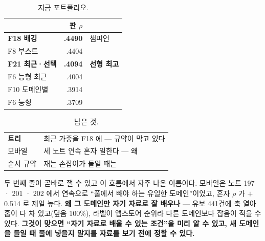 \documentclass[10pt]{article}
\begin{document}

\begin{table}[t]
\centering\tsize
\caption{지금 포트폴리오.}
\begin{tabular}{lrl}
\toprule
& 판 $\rho$ & \\
\midrule
\textbf{F18 배깅} & \textbf{.4490} & 챔피언 \\
F8 부스트 & .4404 & \\
\textbf{F21 최근·선택} & \textbf{.4094} & \textbf{선형 최고} \\
F6 능형 최근 & .4004 & \\
F10 도메인별 & .3914 & \\
F6 능형 & .3709 & \\
\bottomrule
\end{tabular}
\end{table}


\begin{table}[t]
\centering\tsize
\caption{남은 것.}
\begin{tabular}{ll}
\toprule
\textbf{트리} & 최근 가중을 F18 에 --- 규약이 막고 있다 \\
모바일 & 세 노트 연속 혼자 일한다 --- 왜 \\
순서 규약 & 재는 손잡이가 둘일 때는 \\
\bottomrule
\end{tabular}
\end{table}

두 번째 줄이 곧바로 잴 수 있고 이 흐름에서 자주 나온 이름이다. 모바일은
노트 197 · 201 · 202 에서 연속으로 ``풀에서 빼야 하는 유일한 도메인''이었고,
혼자 $\rho$ 가 $+$0.514 로 제일 높다. \textbf{왜 그 도메인만 자기 자료로 잘
배우나} --- 유보 441건에 축 열아홉이 다 차 있고(덮음 100\%), 라벨이 앱스토어
순위라 다른 도메인보다 잡음이 적을 수 있다. \textbf{그것이 맞으면 ``자기
자료로 배울 수 있는 조건''을 미리 알 수 있고, 새 도메인을 들일 때 풀에
넣을지 말지를 자료를 보기 전에 정할 수 있다.}
\end{document}

